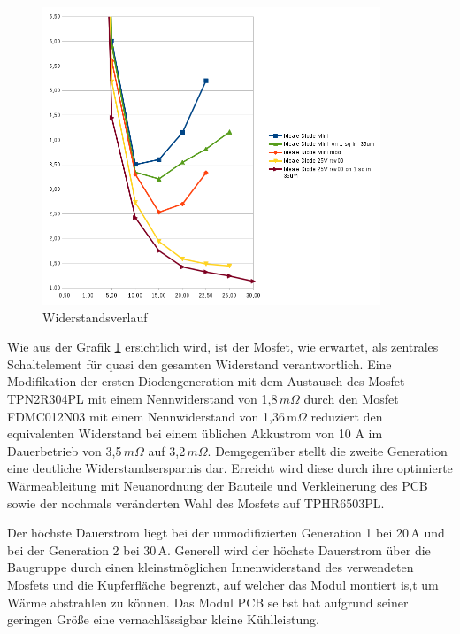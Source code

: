 \begin{figure}[H]
\centering
\includegraphics[width=0.9\textwidth]{graphen/Wiederstand-Strom-Ideale_Diode_ver00} 
\caption{Widerstandsverlauf} 
\label{fig:Widerstandsverlauf}
\end{figure}


Wie aus der Grafik \ref{fig:Widerstandsverlauf} ersichtlich wird, ist der Mosfet, wie erwartet, als zentrales Schaltelement für quasi den gesamten Widerstand verantwortlich.
Eine Modifikation der ersten Diodengeneration mit dem Austausch des Mosfet TPN2R304PL mit einem Nennwiderstand von 1,8\,$m\Omega$ \cite{TPN2R304PL} durch den Mosfet FDMC012N03 mit einem Nennwiderstand von 1,36\,m$\Omega$ \cite{FDMC012N03} reduziert den equivalenten Widerstand bei einem üblichen Akkustrom von 10 A im Dauerbetrieb von 3,5\,$m\Omega$  auf 3,2\,$m\Omega$.
Demgegenüber stellt die zweite Generation eine deutliche Widerstandsersparnis dar.
Erreicht wird diese durch ihre optimierte Wärmeableitung mit Neuanordnung der Bauteile und Verkleinerung des PCB sowie der nochmals veränderten Wahl des Mosfets auf TPHR6503PL.

Der höchste Dauerstrom liegt bei der unmodifizierten Generation 1 bei 20\,A und bei der Generation 2 bei 30\,A. 
Generell wird der höchste Dauerstrom über die Baugruppe durch einen kleinstmöglichen Innenwiderstand des verwendeten Mosfets und die Kupferfläche begrenzt, auf welcher das Modul montiert is,t um Wärme abstrahlen zu können. Das Modul PCB selbst hat aufgrund seiner geringen Größe eine vernachlässigbar kleine Kühlleistung.

